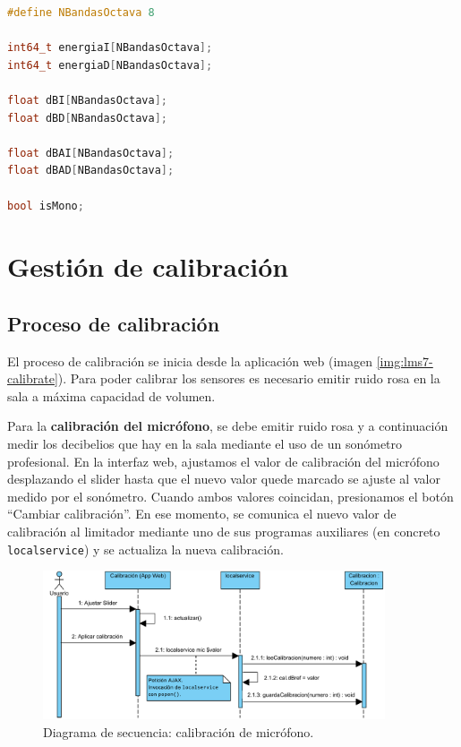 \begin{lstlisting}[language=c++, label={lms7-audio}, caption={Datos miembro de la clase Lectura2C.}]
#define NBandasOctava 8

int64_t energiaI[NBandasOctava];
int64_t energiaD[NBandasOctava];

float dBI[NBandasOctava];
float dBD[NBandasOctava];

float dBAI[NBandasOctava];
float dBAD[NBandasOctava];

bool isMono;
\end{lstlisting}

\clearpage
\section{Gestión de calibración}

\subsection{Proceso de calibración} \label{sec:lms7-calibrar}

El proceso de calibración se inicia desde la aplicación web (imagen \ref{img:lms7-calibrate}). Para poder calibrar los sensores es necesario emitir ruido rosa en la sala a máxima capacidad de volumen.

Para la \textbf{calibración del micrófono}, se debe emitir ruido rosa y a continuación medir los decibelios que hay en la sala mediante el uso de un sonómetro profesional. En la interfaz web, ajustamos el valor de calibración del micrófono desplazando el slider hasta que el nuevo valor quede marcado se ajuste al valor medido por el sonómetro. Cuando ambos valores coincidan, presionamos el botón ``Cambiar calibración''. En ese momento, se comunica el nuevo valor de calibración al limitador mediante uno de sus programas auxiliares (en concreto \verb|localservice|) y se actualiza la nueva calibración.

\begin{figure}[h]
    \centering
    \includegraphics[width=0.9\textwidth]{figuras/lms7-calibrate-mic.pdf}
    \caption{Diagrama de secuencia: calibración de micrófono.}
    \label{fig:lms7-calibrate-mic}
\end{figure}

